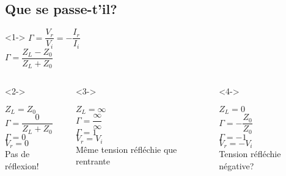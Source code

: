 \subsection{Que se passe-t'il?}
\begin{frame}
    \begin{center}<1->
        $\Gamma = \dfrac{V_r}{V_i} = -\dfrac{I_r}{I_i}$\\
        $\Gamma = \dfrac{Z_L - Z_0}{Z_L + Z_0}$\\
    \end{center}
    \vspace{5mm}
    \begin{columns}
        \begin{column}{0.33\textwidth}<2->
            \begin{center}
                $Z_L = Z_0$\\
                $\Gamma = \dfrac{0}{Z_L + Z_0}$\\
                $\Gamma = 0$\\
                $V_r = 0$\\
                Pas de réflexion!
            \end{center}
        \end{column}
        \begin{column}{0.33\textwidth}<3->
            \begin{center}
                $Z_L = \infty$\\
                $\Gamma = \dfrac{\infty}{\infty}$\\
                $\Gamma = 1$\\
                $V_r = V_i$\\
                Même tension réfléchie que rentrante
            \end{center}
        \end{column}
        \begin{column}{0.33\textwidth}<4->
            \begin{center}
                $Z_L = 0$\\
                $\Gamma = -\dfrac{Z_0}{Z_0}$\\
                $\Gamma = -1$\\
                $V_r = -V_i$\\
                Tension réfléchie négative?
            \end{center}
        \end{column}
    \end{columns}
\end{frame}


